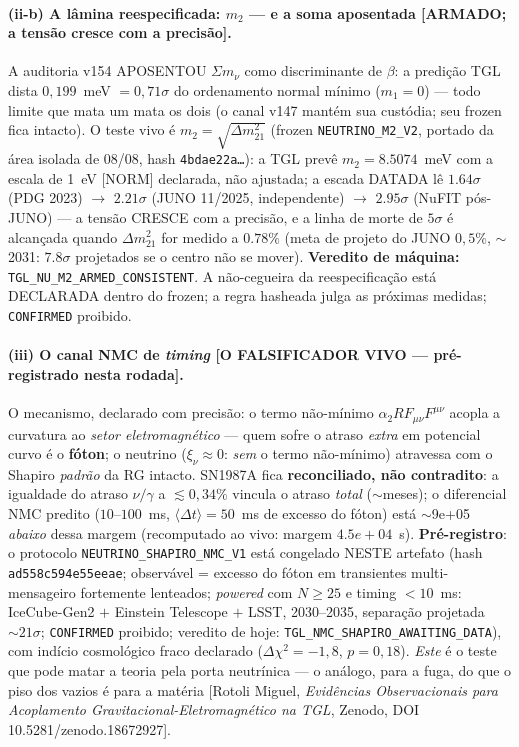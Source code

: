 \documentclass[11pt]{article}
\theoremstyle{definition}\newtheorem{deriv}{Derivação}
\begin{document}
\paragraph{(ii-b) A lâmina reespecificada: $m_2$ --- e a soma aposentada \textsf{[ARMADO; a tensão cresce com a precisão].}} A auditoria v154 APOSENTOU $\Sigma m_\nu$ como discriminante de $\beta$: a predição TGL dista $0{,}199$~meV $=0{,}71\sigma$ do ordenamento normal mínimo ($m_1{=}0$) --- todo limite que mata um mata os dois (o canal v147 mantém sua custódia; seu frozen fica intacto). O teste vivo é $m_2=\sqrt{\Delta m^2_{21}}$ (frozen \texttt{NEUTRINO\_M2\_V2}, portado da área isolada de 08/08, hash \texttt{4bdae22a\ldots}): a TGL prevê $m_2=8.5074$~meV com a escala de 1~eV [NORM] declarada, não ajustada; a escada DATADA lê $1.64\sigma$ (PDG 2023) $\to$ $2.21\sigma$ (JUNO 11/2025, independente) $\to$ $2.95\sigma$ (NuFIT pós-JUNO) --- a tensão CRESCE com a precisão, e a linha de morte de $5\sigma$ é alcançada quando $\Delta m^2_{21}$ for medido a $0.78\%$ (meta de projeto do JUNO $0{,}5\%$, $\sim$2031: $7.8\sigma$ projetados se o centro não se mover). \textbf{Veredito de máquina:} \texttt{TGL\_NU\_M2\_ARMED\_CONSISTENT}. A não-cegueira da reespecificação está DECLARADA dentro do frozen; a regra hasheada julga as próximas medidas; \texttt{CONFIRMED} proibido.

\paragraph{(iii) O canal NMC de \emph{timing} \textsf{[O FALSIFICADOR VIVO --- pré-registrado nesta rodada].}} O mecanismo, declarado com precisão: o termo não-mínimo $\alpha_2 R F_{\mu\nu}F^{\mu\nu}$ \cite{rotolinmc2026} acopla a curvatura ao \emph{setor eletromagnético} --- quem sofre o atraso \emph{extra} em potencial curvo é o \textbf{fóton}; o neutrino ($\xi_\nu\approx0$: \emph{sem} o termo não-mínimo) atravessa com o Shapiro \emph{padrão} da RG intacto. SN1987A fica \textbf{reconciliado, não contradito}: a igualdade do atraso $\nu/\gamma$ a $\lesssim0{,}34\%$ \cite{longo1988,krauss1988} vincula o atraso \emph{total} ($\sim$meses); o diferencial NMC predito ($10$--$100$~ms, $\langle\Delta t\rangle=50$~ms de excesso do fóton) está $\sim$9e+05 \emph{abaixo} dessa margem (recomputado ao vivo: margem $4.5e+04$~s). \textbf{Pré-registro}: o protocolo \texttt{NEUTRINO\_SHAPIRO\_NMC\_V1} está congelado NESTE artefato (hash \texttt{ad558c594e55eeae}; observável = excesso do fóton em transientes multi-mensageiro fortemente lenteados; \emph{powered} com $N\geq25$ e timing $<10$~ms: IceCube-Gen2 $+$ Einstein Telescope $+$ LSST, 2030--2035, separação projetada $\sim21\sigma$; \texttt{CONFIRMED} proibido; veredito de hoje: \texttt{TGL\_NMC\_SHAPIRO\_AWAITING\_DATA}), com indício cosmológico fraco declarado ($\Delta\chi^2=-1{,}8$, $p=0{,}18$). \emph{Este} é o teste que pode matar a teoria pela porta neutrínica --- o análogo, para a fuga, do que o piso dos vazios é para a matéria [Rotoli Miguel, \emph{Evidências Observacionais para Acoplamento Gravitacional-Eletromagnético na TGL}, Zenodo, DOI 10.5281/zenodo.18672927].
\end{document}
